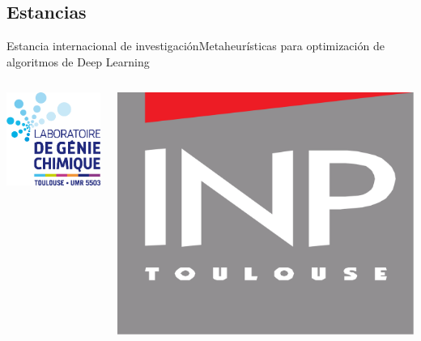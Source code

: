 \documentclass{beamer}
\begin{document}
    \subsection{Estancias}
    \begin{frame}{Estancia internacional de investigación}{Metaheurísticas para optimización de algoritmos de Deep Learning}
        \begin{columns}
            \includegraphics[width=\columnwidth,height=\columnwidth]{lgc}
    
            \includegraphics[width=\columnwidth,height=\columnwidth]{inp}
        \end{columns}
    \end{frame}
\end{document}
